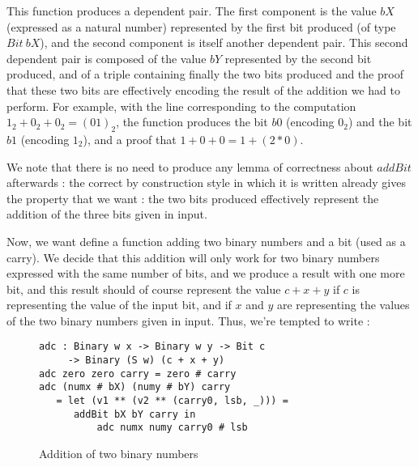 This function produces a dependent pair. The first component is the value $bX$ (expressed as a natural number) represented by the first bit produced (of type $Bit\ bX$), and the second component is itself another dependent pair. This second dependent pair is composed of the value $bY$ represented by the second bit produced, and of a triple containing finally the two bits produced and the proof that these two bits are effectively encoding the result of the addition we had to perform.
For example, with the line corresponding to the computation $1_2 + 0_2 + 0_2 = (01)_2$, the function produces the bit $b0$ (encoding $0_2$) and the bit $b1$ (encoding $1_2$), and a proof that $1 + 0 + 0 = 1 + (2*0)$.

We note that there is no need to produce any lemma of correctness about $addBit$ afterwards : the correct by construction style in which it is written already gives the property that we want : the two bits produced effectively represent the addition of the three bits given in input.

Now, we want define a function adding two binary numbers and a bit (used as a carry). We decide that this addition will only work for two binary numbers expressed with the same number of bits, and we produce a result with one more bit, and this result should of course represent the value $c + x + y$ if $c$ is representing the value of the input bit, and if $x$ and $y$ are representing the values of the two binary numbers given in input. Thus, we're tempted to write :
\begin{figure}[H]
\figrule
\begin{center}
\begin{verbatim}
adc : Binary w x -> Binary w y -> Bit c 
     -> Binary (S w) (c + x + y)
adc zero zero carry = zero # carry
adc (numx # bX) (numy # bY) carry
   = let (v1 ** (v2 ** (carry0, lsb, _))) = 
      addBit bX bY carry in
          adc numx numy carry0 # lsb
\end{verbatim}
\end{center}
\caption{Addition of two binary numbers}
\figrule
\end{figure}

